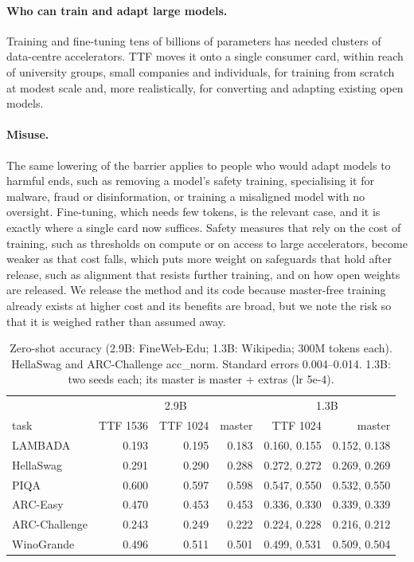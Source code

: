 \documentclass[10pt,twocolumn]{article}
\begin{document}
\paragraph{Who can train and adapt large models.} Training and fine-tuning tens of billions of parameters has needed
clusters of data-centre accelerators. TTF moves it onto a single consumer card, within reach of university groups,
small companies and individuals, for training from scratch at modest scale and, more realistically, for converting and
adapting existing open models.

\paragraph{Misuse.} The same lowering of the barrier applies to people who would adapt models to harmful ends, such as removing
a model's safety training, specialising it for malware, fraud or disinformation, or training a misaligned model with no
oversight. Fine-tuning, which needs few tokens, is the relevant case, and it is exactly where a single card now
suffices. Safety measures that rely on the cost of training, such as thresholds on compute or on access to large
accelerators, become weaker as that cost falls, which puts more weight on safeguards that hold after release, such as
alignment that resists further training, and on how open weights are released. We release the method and its code
because master-free training already exists at higher cost and its benefits are broad, but we note the risk so that it
is weighed rather than assumed away.

\begin{table}[t]
\centering
\caption{Zero-shot accuracy (2.9B: FineWeb-Edu; 1.3B: Wikipedia; 300M tokens each). HellaSwag and ARC-Challenge
acc\_norm. Standard errors 0.004--0.014. 1.3B: two seeds each; its master is master + extras (lr 5e-4).}
\label{tab:zeroshot}
\begin{tabular}{lrrrrr}
\toprule
 & \multicolumn{3}{c}{2.9B} & \multicolumn{2}{c}{1.3B} \\
task & TTF 1536 & TTF 1024 & master & TTF 1024 & master \\
\midrule
LAMBADA & 0.193 & 0.195 & 0.183 & 0.160, 0.155 & 0.152, 0.138 \\
HellaSwag & 0.291 & 0.290 & 0.288 & 0.272, 0.272 & 0.269, 0.269 \\
PIQA & 0.600 & 0.597 & 0.598 & 0.547, 0.550 & 0.532, 0.550 \\
ARC-Easy & 0.470 & 0.453 & 0.453 & 0.336, 0.330 & 0.339, 0.339 \\
ARC-Challenge & 0.243 & 0.249 & 0.222 & 0.224, 0.228 & 0.216, 0.212 \\
WinoGrande & 0.496 & 0.511 & 0.501 & 0.499, 0.531 & 0.509, 0.504 \\
\bottomrule
\end{tabular}
\end{table}
\end{document}
